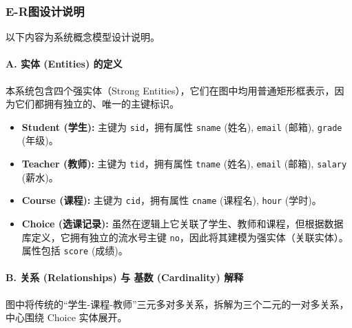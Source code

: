 \documentclass[a4paper]{article}
\begin{document}
\subsubsection{E-R图设计说明}
以下内容为系统概念模型设计说明。

\paragraph{A. 实体 (Entities) 的定义}
本系统包含四个强实体（Strong Entities），它们在图中均用普通矩形框表示，因为它们都拥有独立的、唯一的主键标识。

\begin{itemize}
    \item \textbf{Student (学生):} 主键为 \texttt{sid}，拥有属性 \texttt{sname} (姓名), \texttt{email} (邮箱), \texttt{grade} (年级)。
    \item \textbf{Teacher (教师):} 主键为 \texttt{tid}，拥有属性 \texttt{tname} (姓名), \texttt{email} (邮箱), \texttt{salary} (薪水)。
    \item \textbf{Course (课程):} 主键为 \texttt{cid}，拥有属性 \texttt{cname} (课程名), \texttt{hour} (学时)。
    \item \textbf{Choice (选课记录):} 虽然在逻辑上它关联了学生、教师和课程，但根据数据库定义，它拥有独立的流水号主键 \texttt{no}，因此将其建模为强实体（关联实体）。属性包括 \texttt{score} (成绩)。
\end{itemize}

\paragraph{B. 关系 (Relationships) 与 基数 (Cardinality) 解释}
图中将传统的“学生-课程-教师”三元多对多关系，拆解为三个二元的一对多关系，中心围绕 Choice 实体展开。
\end{document}
